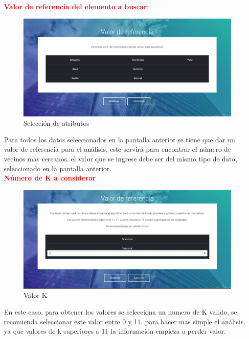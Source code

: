 \textbf{\textcolor{red}{Valor de referencia del elemento a buscar}}
\begin{figure}[H]
	\hypertarget{fig:red}{\hspace{1pt}}
	\begin{center}
		\includegraphics[width=.9\textwidth]{capitulo7/images/referencia.png}
		\caption{Selección de atributos}
		\label{fig:ref}
	\end{center}
\end{figure}
Para todos los datos seleccionados en la pantalla anterior se tiene que dar un valor de referencia para el análisis, este servirá para encontrar el número de vecinos mas cercanos. el valor que se ingrese debe ser del mismo tipo de dato, seleccionado en la pantalla anterior.\\ 
\textbf{\textcolor{red}{Número de K a considerar}}
\begin{figure}[H]
	\hypertarget{fig:red}{\hspace{1pt}}
	\begin{center}
		\includegraphics[width=.9\textwidth]{capitulo7/images/valorK.png}
		\caption{Valor K}
		\label{fig:ref}
	\end{center}
\end{figure}  
En este caso, para obtener los valores se selecciona un numero de K valido, se recomienda seleccionar este valor entre 0 y 11. para hacer mas simple el análisis. ya que valores de k superiores a 11 la información empieza a perder valor.\\
